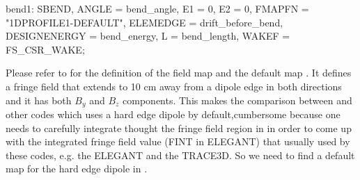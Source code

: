 \begin{description}
\item[Example:]
\item \begin{example}
      bend1: SBEND, ANGLE = bend_angle,
      E1 = 0, E2 = 0,
      FMAPFN = "1DPROFILE1-DEFAULT",
      ELEMEDGE = drift_before_bend,
      DESIGNENERGY = bend_energy,
      L = bend_length,
      WAKEF = FS_CSR_WAKE;
      \end{example}
\end{description}
Please refer to  for the definition of the field map and the default map . It defines a fringe field that extends to 10 cm away from a dipole edge in both directions and it has both $B_y$ and $B_z$ components. This makes the comparison between \opal and other codes which uses a hard edge dipole by default,cumbersome because one needs to carefully integrate thought the fringe field region in \opal in order to come up with the integrated fringe field value (FINT in ELEGANT) that usually used by these codes, e.g. the ELEGANT and the TRACE3D. So we need to find a default map for the hard edge dipole in \opal.

